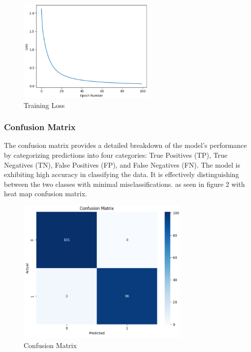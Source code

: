\documentclass{article}
\begin{document}
\begin{figure}[H]
    \centering
    \includegraphics[width=0.6\textwidth]{figures/loss_graph.png} 
    \caption{Training Loss}
    \label{fig:loss_graph}
\end{figure}

\subsubsection{Confusion Matrix}
The confusion matrix provides a detailed breakdown of the model's performance by categorizing predictions into four categories: True Positives (TP), True Negatives (TN), False Positives (FP), and False Negatives (FN). The model is exhibiting high accuracy in classifying the data. It is effectively distinguishing between the two classes with minimal misclassifications. as seen in figure 2 with heat map confusion matrix.

\begin{figure}[H]
    \centering
    \includegraphics[width=0.75\textwidth]{figures/confusion_matrix.png} 
    \caption{Confusion Matrix}
    \label{fig:confusion_matrix}
\end{figure}
\end{document}
